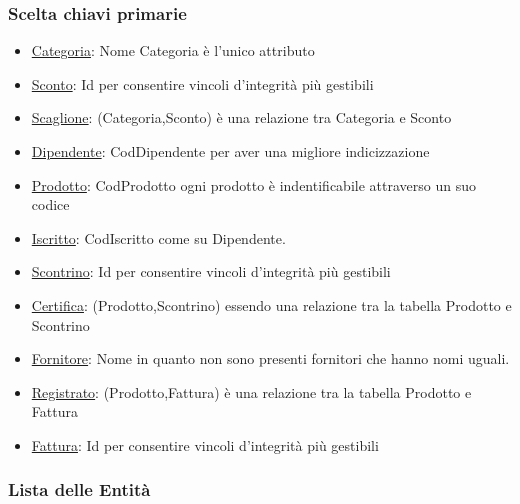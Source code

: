 \newpage
\subsubsection{Scelta chiavi primarie}
\begin{itemize}
  
\item \underline{Categoria}: Nome Categoria \`e l'unico attributo
\item \underline{Sconto}: Id per consentire vincoli d'integrit\`a pi\`u gestibili
\item \underline{Scaglione}: (Categoria,Sconto) \`e una relazione tra Categoria e Sconto
\item \underline{Dipendente}: CodDipendente per aver una migliore indicizzazione
\item \underline{Prodotto}: CodProdotto ogni prodotto \`e indentificabile attraverso un suo codice
\item \underline{Iscritto}: CodIscritto come su Dipendente.
\item \underline{Scontrino}: Id per consentire vincoli d'integrit\`a pi\`u gestibili
\item \underline{Certifica}: (Prodotto,Scontrino) essendo una relazione tra la tabella Prodotto e Scontrino
\item \underline{Fornitore}: Nome in quanto non sono presenti fornitori che hanno nomi uguali.
\item \underline{Registrato}: (Prodotto,Fattura) \`e una relazione tra la tabella Prodotto e Fattura
\item \underline{Fattura}: Id per consentire vincoli d'integrit\`a pi\`u gestibili

\end{itemize}

\subsubsection{Lista delle Entit\`a}

